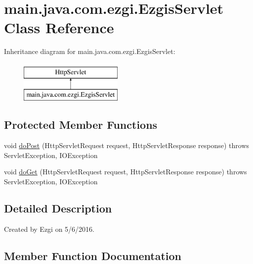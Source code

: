\hypertarget{classmain_1_1java_1_1com_1_1ezgi_1_1_ezgis_servlet}{}\section{main.\+java.\+com.\+ezgi.\+Ezgis\+Servlet Class Reference}
\label{classmain_1_1java_1_1com_1_1ezgi_1_1_ezgis_servlet}
Inheritance diagram for main.\+java.\+com.\+ezgi.\+Ezgis\+Servlet\+:\begin{figure}[H]
\begin{center}
\leavevmode
\includegraphics[height=2.000000cm]{classmain_1_1java_1_1com_1_1ezgi_1_1_ezgis_servlet}
\end{center}
\end{figure}
\subsection*{Protected Member Functions}
\begin{DoxyCompactItemize}
\item 
void \hyperlink{classmain_1_1java_1_1com_1_1ezgi_1_1_ezgis_servlet_a2e3fb2c681dba396ae8f841367d49bab}{do\+Post} (Http\+Servlet\+Request request, Http\+Servlet\+Response response)  throws Servlet\+Exception, I\+O\+Exception 
\item 
void \hyperlink{classmain_1_1java_1_1com_1_1ezgi_1_1_ezgis_servlet_aeaebad3b7b8373e1d43027b47c0b4cc5}{do\+Get} (Http\+Servlet\+Request request, Http\+Servlet\+Response response)  throws Servlet\+Exception, I\+O\+Exception 
\end{DoxyCompactItemize}


\subsection{Detailed Description}
Created by Ezgi on 5/6/2016. 

\subsection{Member Function Documentation}
